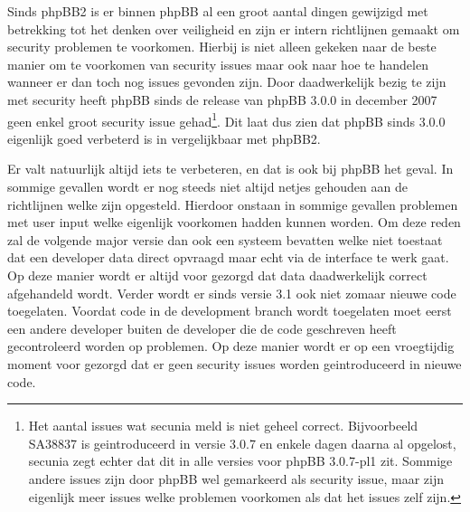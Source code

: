 Sinds phpBB2 is er binnen phpBB al een groot aantal dingen gewijzigd met betrekking tot het denken over veiligheid en zijn er intern richtlijnen gemaakt om security problemen te voorkomen. Hierbij is niet alleen gekeken naar de beste manier om te voorkomen van security issues maar ook naar hoe te handelen wanneer er dan toch nog issues gevonden zijn. Door daadwerkelijk bezig te zijn met security heeft phpBB sinds de release van phpBB 3.0.0 in december 2007 geen enkel groot security issue gehad\cite{bib.phpbb.secunia}\footnote{Het aantal issues wat secunia meld is niet geheel correct. Bijvoorbeeld SA38837 is geintroduceerd in versie 3.0.7 en enkele dagen daarna al opgelost, secunia zegt echter dat dit in alle versies voor phpBB 3.0.7-pl1 zit. Sommige andere issues zijn door phpBB wel gemarkeerd als security issue, maar zijn eigenlijk meer issues welke problemen voorkomen als dat het issues zelf zijn.}. Dit laat dus zien dat phpBB sinds 3.0.0 eigenlijk goed verbeterd is in vergelijkbaar met phpBB2. 

Er valt natuurlijk altijd iets te verbeteren, en dat is ook bij phpBB het geval. In sommige gevallen wordt er nog steeds niet altijd netjes gehouden aan de richtlijnen welke zijn opgesteld. Hierdoor onstaan in sommige gevallen problemen met user input welke eigenlijk voorkomen hadden kunnen worden. Om deze reden zal de volgende major versie dan ook een systeem bevatten welke niet toestaat dat een developer data direct opvraagd maar echt via de interface te werk gaat. Op deze manier wordt er altijd voor gezorgd dat data daadwerkelijk correct afgehandeld wordt.
Verder wordt er sinds versie 3.1 ook niet zomaar nieuwe code toegelaten. Voordat code in de development branch wordt toegelaten moet eerst een andere developer buiten de developer die de code geschreven heeft gecontroleerd worden op problemen. Op deze manier wordt er op een vroegtijdig moment voor gezorgd dat er geen security issues worden geintroduceerd in nieuwe code.
